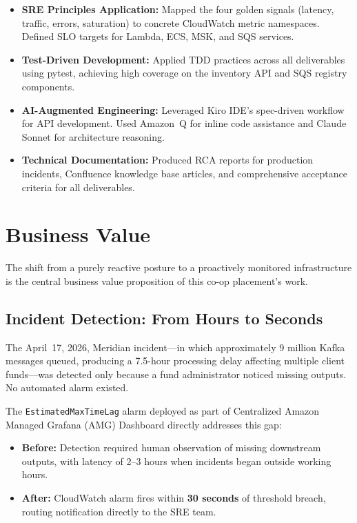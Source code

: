 \begin{itemize}
    \item \textbf{SRE Principles Application:} Mapped the four golden signals
          (latency, traffic, errors, saturation) to concrete CloudWatch metric
          namespaces. Defined SLO targets for Lambda, ECS, MSK, and SQS services.

    \item \textbf{Test-Driven Development:} Applied TDD practices across all
          deliverables using pytest, achieving high coverage on the inventory
          API and SQS registry components.

    \item \textbf{AI-Augmented Engineering:} Leveraged Kiro IDE's spec-driven
          workflow for API development. Used Amazon~Q for inline code assistance
          and Claude Sonnet for architecture reasoning.

    \item \textbf{Technical Documentation:} Produced RCA reports for production
          incidents, Confluence knowledge base articles, and comprehensive
          acceptance criteria for all deliverables.
\end{itemize}


\FloatBarrier

\section{Business Value}
\label{sec:business_value}


The shift from a purely reactive posture to a proactively monitored infrastructure
is the central business value proposition of this co-op placement's work.

\subsection{Incident Detection: From Hours to Seconds}

The April~17, 2026, Meridian incident---in which approximately 9 million Kafka
messages queued, producing a 7.5-hour processing delay affecting multiple
client funds---was detected only because a fund administrator noticed missing
outputs. No automated alarm existed.

The \texttt{EstimatedMaxTimeLag} alarm deployed as part of Centralized Amazon Managed Grafana (AMG) Dashboard directly
addresses this gap:

\begin{itemize}
    \item \textbf{Before:} Detection required human observation of missing
          downstream outputs, with latency of 2--3 hours when incidents began
          outside working hours.
    \item \textbf{After:} CloudWatch alarm fires within \textbf{30 seconds} of
          threshold breach, routing notification directly to the SRE team.
\end{itemize}

